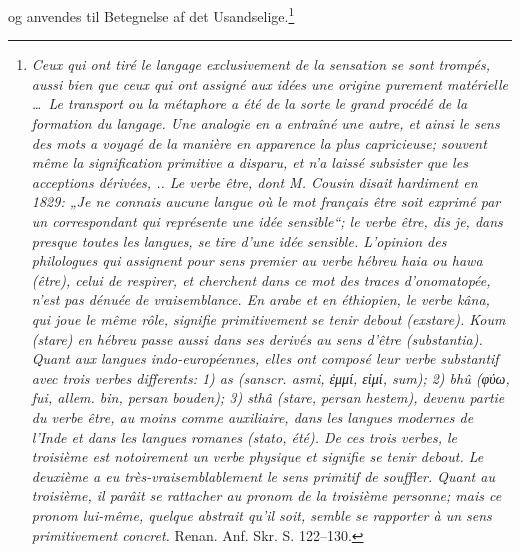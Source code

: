 \documentclass[12pt]{book}
\begin{document}
og anvendes til Betegnelse af det Usandselige.\footnote{%
\textit{Ceux qui ont tiré le langage exclusivement de la sensation se
sont trompés, aussi bien que ceux qui ont assigné aux idées une
origine purement matérielle \ldots\ Le \emph{transport} ou la métaphore
a été de la sorte le grand procédé de la formation du langage.
Une analogie en a entraîné une autre, et ainsi le sens des
mots a voyagé de la manière en apparence la plus capricieuse;
souvent même la signification primitive a disparu, et n'a laissé
subsister que les acceptions dérivées, .. Le verbe \emph{être}, dont M.
Cousin disait hardiment en 1829: „Je ne connais aucune langue
où le mot français \emph{être} soit exprimé par un correspondant qui
représente une idée sensible“; le verbe \emph{être}, dis je, dans
presque toutes les langues, se tire d'une idée sensible. L'opinion des
philologues qui assignent pour sens premier au verbe hébreu \emph{haia}
ou \emph{hawa} (\emph{être}), celui de \emph{respirer}, et cherchent dans ce mot des
traces d'onomatopée, n'est pas dénuée de vraisemblance. En arabe
et en éthiopien, le verbe \emph{kâna}, qui joue le même rôle, signifie
primitivement \emph{se tenir debout} (\emph{exstare}). \emph{Koum} (\emph{stare})
en hébreu passe aussi dans ses derivés au sens \emph{d'être}
(\emph{substantia}). Quant aux langues indo-européennes, elles ont
composé leur verbe substantif avec trois verbes differents: 1) \emph{as}
(sanscr. \emph{asmi}, ἐμμί, εἰμί, sum); 2) bhû (φύω, \emph{fui}, allem. \emph{bin},
persan \emph{bouden}); 3) \emph{sthâ} (\emph{stare}, persan \emph{hestem}), devenu
partie du verbe \emph{être}, au moins comme auxiliaire, dans les langues
modernes de l'Inde et dans les langues romanes (stato, été). De
ces trois verbes, le troisième est notoirement un verbe physique
et signifie se \emph{tenir debout}. Le deuxième a eu
très-vraisemblablement le sens primitif de \emph{souffler}. Quant au troisième, il
parâit se rattacher au pronom de la troisième personne; mais ce
pronom lui-même, quelque abstrait qu'il soit, semble se rapporter à
un sens primitivement concret.} Renan. Anf. Skr. S. 122--130.}
\end{document}
